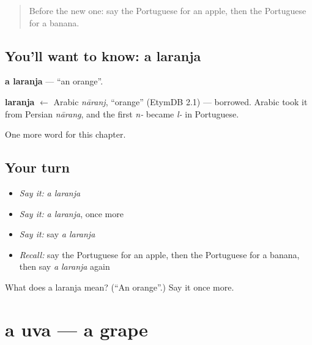 \label{lesson:PT-C45-laranja}



\begin{quote}
Before the new one: say the Portuguese for an apple, then the Portuguese for a banana.
\end{quote}

\subsection*{You'll want to know: a laranja}
\textbf{a laranja} — \textquotedblleft{}an orange\textquotedblright{}.

\begin{cousinweb}
\textbf{laranja} $\leftarrow$ Arabic \emph{nāranj}, \textquotedblleft{}orange\textquotedblright{} (EtymDB 2.1) — borrowed. Arabic took it from Persian \emph{nārang}, and the first \emph{n-} became \emph{l-} in Portuguese.
\end{cousinweb}

\begin{grammarlens}[title={What you've built}]
One more word for this chapter.
\end{grammarlens}

\subsection*{Your turn}
\begin{itemize}
\raggedright
  \item \emph{Say it:} \emph{a laranja}
  \item \emph{Say it:} \emph{a laranja}, once more
  \item \emph{Say it:} say \emph{a laranja}
  \item \emph{Recall:} say the Portuguese for an apple, then the Portuguese for a banana, then say \emph{a laranja} again
\end{itemize}

\begin{tcolorbox}[breakable,colback=teal!4,colframe=teal!35!black,title={Before you move on}]
What does a laranja mean? (\textquotedblleft{}An orange\textquotedblright{}.) Say it once more.
\end{tcolorbox}
\section[a uva]{a uva — a grape}

\label{lesson:PT-C45-uva}



